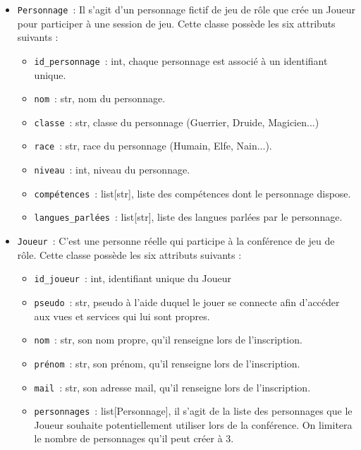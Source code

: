 \documentclass[11pt]{article}
\begin{document}
\begin{itemize}
    \item \texttt{Personnage}~: Il s'agit d'un personnage fictif de jeu de rôle que crée un Joueur pour participer à une session de jeu. Cette classe possède les six attributs suivants :
    \begin{itemize}[label=, font=\small]
        \item \texttt{id\_personnage}~: int, chaque personnage est associé à un identifiant unique.
        \item \texttt{nom}~: str, nom du personnage.
        \item \texttt{classe}~: str, classe du personnage (Guerrier, Druide, Magicien...)
        \item \texttt{race}~: str, race du personnage (Humain, Elfe, Nain...).
        \item \texttt{niveau}~: int, niveau du personnage.
        \item \texttt{compétences}~: list[str], liste des compétences dont le personnage dispose.
        \item \texttt{langues\_parlées}~: list[str], liste des langues parlées par le personnage.
    \end{itemize}

    \item \texttt{Joueur}~: C'est une personne réelle qui participe à la conférence de jeu de rôle. Cette classe possède les six attributs suivants :
    \begin{itemize}[label=, font=\small]
        \item \texttt{id\_joueur}~: int, identifiant unique du Joueur
        \item \texttt{pseudo}~: str, pseudo à l'aide duquel le jouer se connecte afin d'accéder aux vues et services qui lui sont propres.
        \item \texttt{nom}~: str, son nom propre, qu'il renseigne lors de l'inscription.
        \item \texttt{prénom}~: str, son prénom, qu'il renseigne lors de l'inscription.
        \item \texttt{mail}~: str, son adresse mail, qu'il renseigne lors de l'inscription.
        \item \texttt{personnages}~: list[Personnage], il s'agit de la liste des personnages que le Joueur souhaite potentiellement utiliser lors de la conférence. On limitera le nombre de personnages qu'il peut créer à 3.
    \end{itemize}
\end{itemize}
\end{document}
